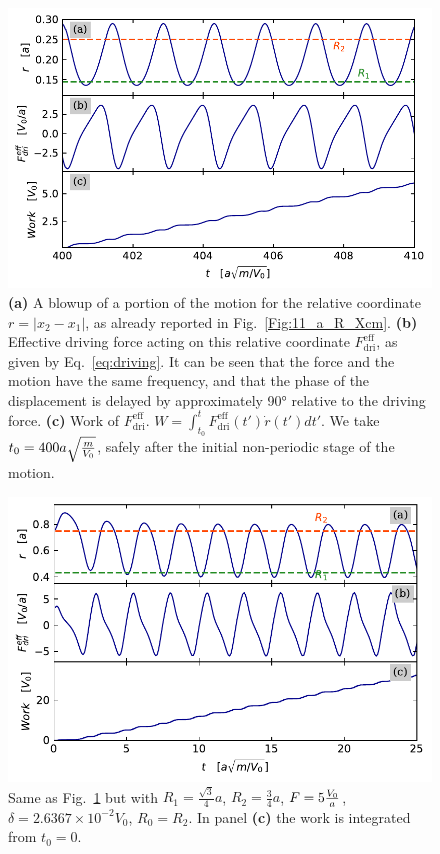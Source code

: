 \begin{figure}
\begin{center}
    \centering
    \includegraphics[width=1\linewidth]{Images/11_a_R_Forzante_2.pdf}
    \caption{\textbf{(a)} A blowup of a portion of the motion for the relative coordinate $r = |x_2 - x_1|$, as already reported in Fig.~\ref{Fig:11_a_R_Xcm}. \textbf{(b)} Effective driving force acting on this relative coordinate $F_{\text{dri}}^{\text{eff}}$, as given by Eq.~\eqref{eq:driving}. It can be seen that the force and the motion have the same frequency, and that the phase of the displacement is delayed by approximately 90° relative to the driving force. \textbf{(c)} Work of $F_{\text{dri}}^{\text{eff}}$. $W = \int_{t_0}^t F_{\text{dri}}^{\text{eff}}(t') \dot{r}(t') dt' $. We take $t_0 = 400 a\sqrt{\frac{m}{V_0}}$, safely after the initial non-periodic stage of the motion. }
    \label{Fig:11_a_R_Forzante}
\end{center}
\end{figure}


\begin{figure}
\begin{center}
    \centering
    \includegraphics[width=1\linewidth]{Images/11_b_R_Forzante_2.pdf}
    \caption{Same as Fig.~\ref{Fig:11_a_R_Forzante} but with $R_1 = \frac{\sqrt{3}}{4} a$, $R_2 = \frac{3}{4} a$, $F = 5 \frac{V_0}{a}$, $\delta = 2.6367 \times 10^{-2} V_0$, $R_0=R_2$. In panel \textbf{(c)} the work is integrated from $t_0 = 0 $.}
    \label{Fig:11_b_R_Forzante}
\end{center}
\end{figure}



